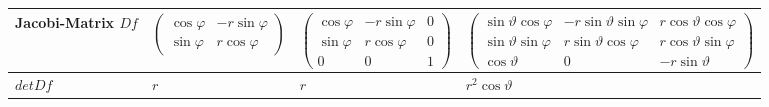 \begin{tabular}{|p{2.5cm}||p{3cm}|p{4.2cm}|p{7.5cm}|}
	\hline
	Jacobi-Matrix $Df$ &
	\begin{minipage}{3cm}
    \vspace{0.1cm}
		$\begin{pmatrix}
         	\cos\varphi & -r\sin\varphi\\
         	\sin\varphi & r\cos\varphi
         \end{pmatrix}$
    \vspace{0.1cm}
    \end{minipage}&	
	\begin{minipage}{4.2cm}
    \vspace{0.1cm}
		$\begin{pmatrix}
         	\cos\varphi & -r\sin\varphi & 0\\
         	\sin\varphi & r\cos\varphi & 0\\
         	0 & 0 & 1
         \end{pmatrix}$
    \vspace{0.1cm}
    \end{minipage}&	
	\begin{minipage}{7.5cm}
    \vspace{0.1cm}
		$\begin{pmatrix}
         	\sin\vartheta\cos\varphi & -r\sin\vartheta\sin\varphi &
         	r\cos\vartheta\cos\varphi\\
         	\sin\vartheta\sin\varphi & r\sin\vartheta\cos\varphi &
         	r\cos\vartheta\sin\varphi\\
         	\cos\vartheta & 0 & -r\sin\vartheta
         \end{pmatrix}$
    \vspace{0.1cm}
    \end{minipage}\\
	\hline
	\begin{minipage}{2.5cm}
    	\vspace{0.1cm}
  		$detDf$   
  		\vspace{0.1cm}
    \end{minipage}&
		$r$ &
		$r$ &
		$r^2\cos\vartheta$\\
	\hline	
\end{tabular}